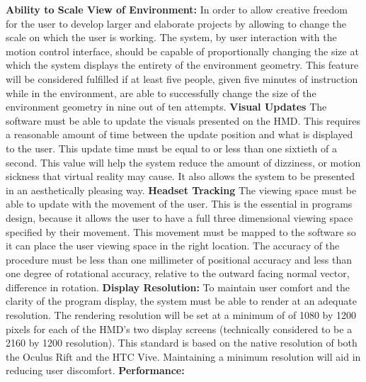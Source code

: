 \documentclass[onecolumn, draftclsnofoot,10pt, compsoc]{IEEEtran}
\newcounter{threesection}[subsubsection]
\begin{document}
\newline 
\textbf{Ability to Scale View of Environment:}
\newline
In order to allow creative freedom for the user to develop larger and elaborate projects by allowing to change the scale on which the user is working.
The system, by user interaction with the motion control interface, should be capable of proportionally changing the size at which the system displays the entirety of the environment geometry.
This feature will be considered fulfilled if at least five people, given five minutes of instruction while in the environment, are able to successfully change the size of the environment geometry in nine out of ten attempts.
\textbf{Visual Updates}
\newline
The software must be able to update the visuals presented on the HMD.
This requires a reasonable amount of time between the update position and what is displayed to the user. This update time must be equal to or less than one sixtieth of a second.
This value will help the system reduce the amount of dizziness, or motion sickness that virtual reality may cause.
It also allows the system to be presented in an aesthetically pleasing way.
\newline
\textbf{Headset Tracking}
\newline
The viewing space must be able to update with the movement of the user.
This is the essential in programs design, because it allows the user to have a full three dimensional viewing space specified by their movement.
This movement must be mapped to the software so it can place the user viewing space in the right location.
The accuracy of the procedure must be less than one millimeter of positional accuracy and less than one degree of rotational accuracy, relative to the outward facing normal vector, difference in rotation.
\newline
\textbf{Display Resolution:}
\newline
To maintain user comfort and the clarity of the program display, the system must be able to render at an adequate resolution.
The rendering resolution will be set at a minimum of of 1080 by 1200 pixels for each of the HMD’s two display screens (technically considered to be a 2160 by 1200 resolution).
This standard is based on the native resolution of both the Oculus Rift and the HTC Vive.
Maintaining a minimum resolution will aid in reducing user discomfort.
\textbf{Performance:}
\newline
\end{document}
